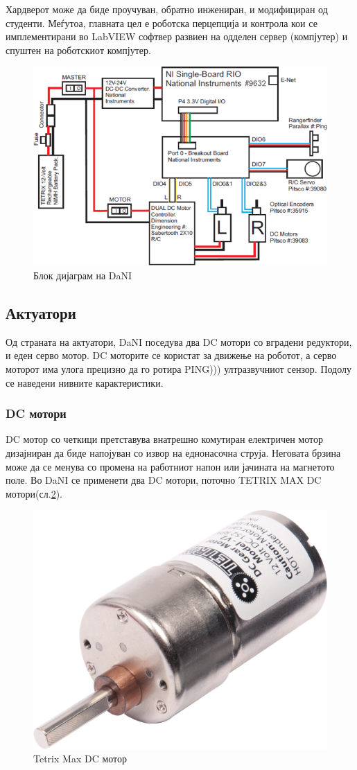 \documentclass[12pt]{article}
\begin{document}
	Хардверот може да биде проучуван, обратно инжениран, и модифициран од студенти. Меѓутоа, главната цел е роботска перцепција и контрола кои се имплементирани во LabVIEW софтвер развиен на одделен сервер (компјутер) и спуштен на роботскиот компјутер.

	\begin{figure}[H]
		\includegraphics[width=0.75\linewidth]{./images/dani_block_diagram.png}
		\centering
		\caption{Блок дијаграм на DaNI}
		\label{fig:dani_block_diagram.png}
		\end{figure}

	\subsection{Актуатори}
		Од страната на актуатори, DaNI поседува два DC мотори со вградени редуктори, и еден серво мотор. DC моторите се користат за движење на роботот, а серво моторот има улога прецизно да го ротира PING))) ултразвучниот сензор. Подолу се наведени нивните карактеристики.

	  \subsubsection{DC мотори}
		  DC мотор со четкици претставува внатрешно комутиран електричен мотор дизајниран да биде напојуван со извор на еднонасочна струја. Неговата брзина може да се менува со промена на работниот напон или јачината на магнетото поле.
		  Во DaNI се применети два DC мотори, поточно TETRIX MAX DC мотори(сл.\ref{fig:dc_motor_iso.png}).

		  \begin{figure}[H]
    	  \includegraphics[width=0.35\linewidth]{./images/dc_motor_iso.png}
			  \centering
			  \caption{Tetrix Max DC мотор}
			  \label{fig:dc_motor_iso.png}
			  \end{figure}
\end{document}
